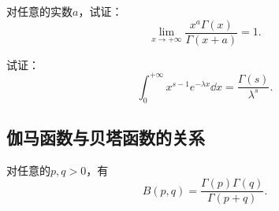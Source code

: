 \begin{example}
对任意的实数\(a\)，试证：\[
\lim\limits_{x\to+\infty} \frac{x^a \Gamma(x)}{\Gamma(x+a)} = 1.
\]
\end{example}

\begin{example}
试证：\begin{equation}
\int_0^{+\infty} x^{s-1} e^{-\lambda x} \dd{x}
= \frac{\Gamma(s)}{\lambda^s}.
\end{equation}
\end{example}

\subsection{伽马函数与贝塔函数的关系}
\begin{theorem}
对任意的\(p,q>0\)，有\begin{equation}\label{equation:定积分.伽马函数与贝塔函数的关系}
B(p,q) = \frac{\Gamma(p) \Gamma(q)}{\Gamma(p+q)}.
\end{equation}
\end{theorem}
